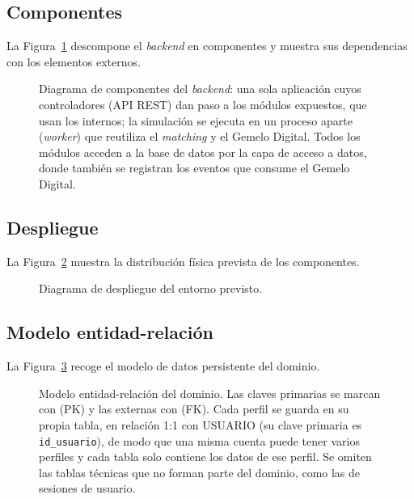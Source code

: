\subsection{Componentes}

La Figura~\ref{fig:componentes} descompone el \textit{backend} en componentes y muestra sus dependencias con los elementos externos.

\begin{figure}[H]
  \centering
  
  \caption[Diagrama de componentes del \textit{backend}]{Diagrama de componentes del \textit{backend}: una sola aplicación cuyos controladores (API REST) dan paso a los módulos expuestos, que usan los internos; la simulación se ejecuta en un proceso aparte (\textit{worker}) que reutiliza el \textit{matching} y el Gemelo Digital. Todos los módulos acceden a la base de datos por la capa de acceso a datos, donde también se registran los eventos que consume el Gemelo Digital.}
  \label{fig:componentes}
\end{figure}

\subsection{Despliegue}

La Figura~\ref{fig:despliegue} muestra la distribución física prevista de los componentes.

\begin{figure}[H]
  \centering
  
  \caption{Diagrama de despliegue del entorno previsto.}
  \label{fig:despliegue}
\end{figure}

\subsection{Modelo entidad-relación}

La Figura~\ref{fig:er-dominio} recoge el modelo de datos persistente del dominio.

\begin{figure}[H]
  \centering
  \resizebox{\textwidth}{!}{}
  \caption[Modelo entidad-relación del dominio]{Modelo entidad-relación del dominio. Las claves primarias se marcan con (PK) y las externas con (FK). Cada perfil se guarda en su propia tabla, en relación 1:1 con USUARIO (su clave primaria es \texttt{id\_usuario}), de modo que una misma cuenta puede tener varios perfiles y cada tabla solo contiene los datos de ese perfil. Se omiten las tablas técnicas que no forman parte del dominio, como las de sesiones de usuario.}
  \label{fig:er-dominio}
\end{figure}


